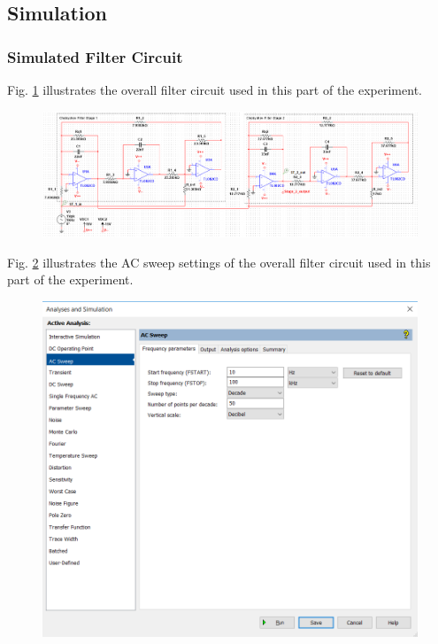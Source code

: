 \documentclass[hidelinks]{article}
\begin{document}
	\pagebreak	
	\subsection{Simulation}
	\subsubsection{Simulated Filter Circuit}
	Fig. \ref{f:circuit1} illustrates the overall filter circuit used in this part of the experiment.
	\begin{figure}[htbp]
		\centering
		\includegraphics[width=0.65\textheight]{circuit1.png}
		\label{f:circuit1}
	\end{figure}

	\noindent Fig. \ref{f:settings} illustrates the AC sweep settings of the overall filter circuit used in this part of the experiment.
		\begin{figure}[htbp]
		\centering
		\includegraphics[width=0.5\textheight]{sim_settings.png}
		\label{f:settings}
	\end{figure}
	
\end{document}
